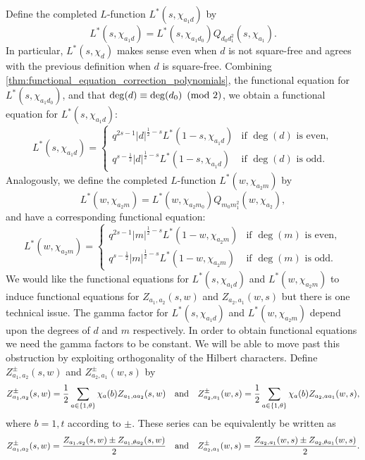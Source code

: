 \documentclass[12pt,reqno,oneside]{amsart}
\begin{document}
    Define the completed $L$-function $L^{\ast}(s,\chi_{a_{1}d})$ by
    \[
        L^{\ast}(s,\chi_{a_{1}d}) = L^{\ast}(s,\chi_{a_{1}d_{0}})Q_{d_{0}d_{1}^{2}}(s,\chi_{a_{1}}).
    \]
    In particular, $L^{\ast}(s,\chi_{d})$ makes sense even when $d$ is not square-free and agrees with the previous definition when $d$ is square-free.
    Combining \cref{thm:functional_equation_correction_polynomials}, the functional equation for $L^{\ast}(s,\chi_{a_{1}d_{0}})$, and that $\deg(d) \equiv \deg(d_{0}) \ \left(\text{mod }2\right)$, we obtain a functional equation for $L^{\ast}(s,\chi_{a_{1}d})$:
    \[
        L^{\ast}(s,\chi_{a_{1}d}) = \begin{cases} q^{2s-1}|d|^{\frac{1}{2}-s}L^{\ast}(1-s,\chi_{a_{1}d}) & \text{if $\deg(d)$ is even}, \\ q^{s-\frac{1}{2}}|d|^{\frac{1}{2}-s}L^{\ast}(1-s,\chi_{a_{1}d}) & \text{if $\deg(d)$ is odd}. \end{cases}
    \]
    Analogously, we define the completed $L$-function $L^{\ast}(w,\chi_{a_{2}m})$ by
    \[
        L^{\ast}(w,\chi_{a_{2}m}) = L^{\ast}(w,\chi_{a_{2}m_{0}})Q_{m_{0}m_{1}^{2}}(w,\chi_{a_{2}}),
    \]
    and have a corresponding functional equation:
    \[
        L^{\ast}(w,\chi_{a_{2}m}) = \begin{cases} q^{2s-1}|m|^{\frac{1}{2}-s}L^{\ast}(1-w,\chi_{a_{2}m}) & \text{if $\deg(m)$ is even}, \\ q^{s-\frac{1}{2}}|m|^{\frac{1}{2}-s}L^{\ast}(1-w,\chi_{a_{2}m}) & \text{if $\deg(m)$ is odd}. \end{cases}
    \]
    We would like the functional equations for $L^{\ast}(s,\chi_{a_{1}d})$ and $L^{\ast}(w,\chi_{a_{2}m})$ to induce functional equations for $Z_{a_{1},a_{2}}(s,w)$ and $Z_{a_{2},a_{1}}(w,s)$ but there is one technical issue. The gamma factor for $L^{\ast}(s,\chi_{a_{1}d})$ and $L^{\ast}(w,\chi_{a_{2}m})$ depend upon the degrees of $d$ and $m$ respectively. In order to obtain functional equations we need the gamma factors to be constant. We will be able to move past this obstruction by exploiting orthogonality of the Hilbert characters. Define $Z_{a_{1},a_{2}}^{\pm}(s,w)$ and $Z_{a_{2},a_{1}}^{\pm}(w,s)$ by
    \[
        Z_{a_{1},a_{2}}^{\pm}(s,w) = \frac{1}{2}\sum_{a \in \{1,\theta\}}\chi_{a}(b)Z_{a_{1},aa_{2}}(s,w) \quad \text{and} \quad Z_{a_{2},a_{1}}^{\pm}(w,s) = \frac{1}{2}\sum_{a \in \{1,\theta\}}\chi_{a}(b)Z_{a_{2},aa_{1}}(w,s),
    \]
    where $b = 1,t$ according to $\pm$. These series can be equivalently be written as
    \[
        Z_{a_{1},a_{2}}^{\pm}(s,w) = \frac{Z_{a_{1},a_{2}}(s,w)\pm{Z_{a_{1},\theta a_{2}}(s,w)}}{2} \quad \text{and} \quad Z_{a_{2},a_{1}}^{\pm}(w,s) = \frac{Z_{a_{2},a_{1}}(w,s)\pm{Z_{a_{2},\theta a_{1}}(w,s)}}{2}.
    \]
\end{document}
